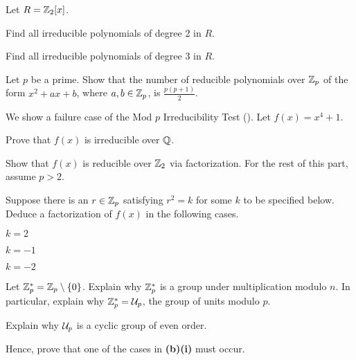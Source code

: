 \begin{problem}
    Let $R = \mathbb{Z}_2[x]$.
    \begin{partquestions}{\alph*}
        \item Find all irreducible polynomials of degree 2 in $R$.
        \item Find all irreducible polynomials of degree 3 in $R$.
    \end{partquestions}
\end{problem}

\begin{problem}
    Let $p$ be a prime. Show that the number of reducible polynomials over $\mathbb{Z}_p$ of the form $x^2 + ax + b$, where $a,b \in \mathbb{Z}_p$, is $\frac{p(p+1)}2$.
\end{problem}

\begin{problem}\label{problem-failure-case-of-mod-p-irreducibility-test}
    We show a failure case of the Mod $p$ Irreducibility Test (). Let $f(x) = x^4 + 1$.
    \begin{partquestions}{\alph*}
        \item Prove that $f(x)$ is irreducible over $\mathbb{Q}$.
        \item Show that $f(x)$ is reducible over $\mathbb{Z}_2$ via factorization.\newline
        For the rest of this part, assume $p > 2$.
        \begin{partquestions}{\roman*}
            \item Suppose there is an $r \in \mathbb{Z}_p$ satisfying $r^2 = k$ for some $k$ to be specified below. Deduce a factorization of $f(x)$ in the following cases.
            \begin{partquestions}{\alph*}
                \item $k = 2$
                \item $k = -1$
                \item $k = -2$
            \end{partquestions}
            \item Let $\mathbb{Z}_p^\ast = \mathbb{Z}_p \setminus \{0\}$. Explain why $\mathbb{Z}_p^\ast$ is a group under multiplication modulo $n$. In particular, explain why $\mathbb{Z}_p^\ast = \mathcal{U}_{p}$, the group of units modulo $p$.
            \item Explain why $\mathcal{U}_{p}$ is a cyclic group of even order.
            \item Hence, prove that one of the cases in \textbf{(b)(i)} must occur.
        \end{partquestions}
    \end{partquestions}
\end{problem}

